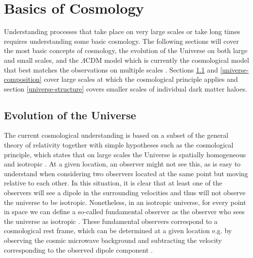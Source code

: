 \documentclass[english, twoside]{HYgradu}
\begin{document}
\section{Basics of Cosmology}
Understanding processes that take place on very large scales or take long times requires understanding some basic cosmology. The following sections will cover the most basic concepts of cosmology, the evolution of the Universe on both large and small scales, and the $\Lambda$CDM model which is currently the cosmological model that best matches the observations on multiple scales \citep{mo2010galaxy}. Sections \ref{universe-evolution} and \ref{universe-composition} cover large scales at which the cosmological principle applies and section \ref{universe-structure} covers smaller scales of individual dark matter haloes.

\subsection{Evolution of the Universe} \label{universe-evolution}

The current cosmological understanding is based on a subset of the general theory of relativity together with simple hypotheses such as the cosmological principle, which states that on large scales the Universe is spatially homogeneous and isotropic \citep{mo2010galaxy}. At a given location, an observer might not see this, as is easy to understand when considering two observers located at the same point but moving relative to each other. In this situation, it is  clear that at least one of the observers will see a dipole in the surrounding velocities and thus will not observe the universe to be isotropic. Nonetheless, in an isotropic universe, for every point in space we can define a so-called fundamental observer as the observer who sees the universe as isotropic \citep{mo2010galaxy}. These fundamental observers correspond to a cosmological rest frame, which can be determined at a given location e.g. by observing the cosmic microwave background and subtracting the velocity corresponding to the observed dipole component \citep{mo2010galaxy}.
\end{document}
